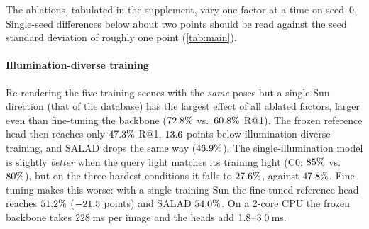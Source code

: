 The ablations, tabulated in the supplement, vary one factor at a time on seed~0. Single-seed differences below about two
points should be read against the seed standard deviation of roughly one point (\cref{tab:main}).

\paragraph*{Illumination-diverse training}
Re-rendering the five training scenes with the \emph{same} poses but a single Sun direction (that of
the database) has the largest effect of all ablated factors, larger even than
fine-tuning the backbone ($72.8\%$ vs.\ $60.8\%$ R@1). The frozen reference head then
reaches only $47.3\%$ R@1, $13.6$ points below illumination-diverse training, and SALAD
drops the same way ($46.9\%$). The single-illumination model is slightly \emph{better} when
the query light matches its training light (C0: $85\%$ vs.\ $80\%$), but on the
three hardest conditions it falls to $27.6\%$, against $47.8\%$. Fine-tuning makes
this worse: with a single training Sun the fine-tuned reference head reaches $51.2\%$
($-21.5$ points) and SALAD $54.0\%$.
On a 2-core CPU the frozen backbone takes $228$\,ms per image and the heads add $1.8$--$3.0$\,ms.
